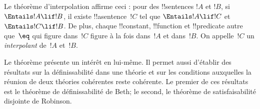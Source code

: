 \documentclass[../../../include/open-logic-section]{subfiles}
\begin{document}

Le théorème d'interpolation affirme ceci :
pour des !!{sentence}s $!A$ et $!B$, si $\Entails !A\lif !B$, il existe
!!a{sentence}~$!C$ tel que
$\Entails !A\lif !C$ et
$\Entails !C\lif !B$.
De plus, chaque !!{constant},
!!{function} et !!{predicate}
autre que~$\eq$ qui figure dans~$!C$
figure à la fois dans~$!A$ et dans~$!B$.
On appelle~$!C$ un \emph{interpolant}
de~$!A$ et~$!B$.

Le théorème présente un intérêt en lui-même.
Il permet aussi d'établir des résultats
sur la définissabilité dans une théorie
et sur les conditions auxquelles la réunion
de deux théories cohérentes reste cohérente.
Le premier de ces résultats est le
théorème de définissabilité de Beth;
le second, le théorème de satisfaisabilité
disjointe de Robinson.
\end{document}
